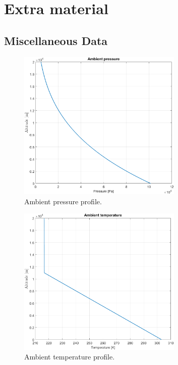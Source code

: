 \documentclass[english]{kththesis}
\begin{document}
\chapter{Extra material}


\section{Miscellaneous Data}
\label{sec:AppMiscData}

\begin{figure}[!ht]
    \centering
    \includegraphics[width=0.7\textwidth]{Epictures/AmbientPressure.png}
    \caption{Ambient pressure profile.}
    \label{fig:Pamb}
\end{figure}

\begin{figure}[!ht]
    \centering
    \includegraphics[width=0.7\textwidth]{Epictures/AmbientTemperature.png}
    \caption{Ambient temperature profile.}
    \label{fig:Tamb}
\end{figure}
\end{document}
